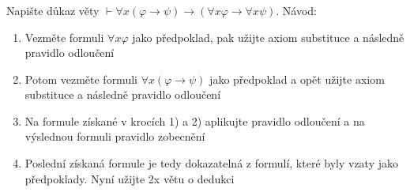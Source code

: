 \subsubsection{}
Napište důkaz věty $\vdash \forall x (\varphi \rightarrow \psi) \rightarrow
(\forall x \varphi \rightarrow \forall x \psi)$. Návod:

\begin{enumerate}
  \item Vezměte formuli $\forall x \varphi$ jako předpoklad, pak užijte axiom substituce a
následně pravidlo odloučení
  \item Potom vezměte formuli $\forall x (\varphi \rightarrow \psi)$ jako předpoklad a opět užijte axiom
substituce a následně pravidlo odloučení
  \item Na formule získané v krocích 1) a 2) aplikujte pravidlo odloučení a na
výslednou formuli pravidlo zobecnění
  \item Poslední získaná formule je tedy dokazatelná z formulí, které byly vzaty
jako předpoklady. Nyní užijte 2x větu o dedukci
\end{enumerate}
